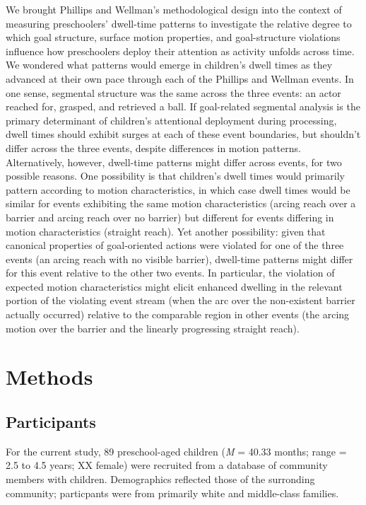 \documentclass[
  english,
  man,floatsintext]{apa6}
\begin{document}
We brought Phillips and Wellman's methodological design into the context of measuring preschoolers' dwell-time patterns to investigate the relative degree to which goal structure, surface motion properties, and goal-structure violations influence how preschoolers deploy their attention as activity unfolds across time. We wondered what patterns would emerge in children's dwell times as they advanced at their own pace through each of the Phillips and Wellman events. In one sense, segmental structure was the same across the three events: an actor reached for, grasped, and retrieved a ball. If goal-related segmental analysis is the primary determinant of children's attentional deployment during processing, dwell times should exhibit surges at each of these event boundaries, but shouldn't differ across the three events, despite differences in motion patterns. Alternatively, however, dwell-time patterns might differ across events, for two possible reasons. One possibility is that children's dwell times would primarily pattern according to motion characteristics, in which case dwell times would be similar for events exhibiting the same motion characteristics (arcing reach over a barrier and arcing reach over no barrier) but different for events differing in motion characteristics (straight reach). Yet another possibility: given that canonical properties of goal-oriented actions were violated for one of the three events (an arcing reach with no visible barrier), dwell-time patterns might differ for this event relative to the other two events. In particular, the violation of expected motion characteristics might elicit enhanced dwelling in the relevant portion of the violating event stream (when the arc over the non-existent barrier actually occurred) relative to the comparable region in other events (the arcing motion over the barrier and the linearly progressing straight reach).

\hypertarget{methods}{%
\section{Methods}\label{methods}}

\hypertarget{participants}{%
\subsection{Participants}\label{participants}}

For the current study, 89 preschool-aged children (\emph{M} = 40.33 months; range = 2.5 to 4.5 years; XX female) were recruited from a database of community members with children. Demographics reflected those of the surronding community; particpants were from primarily white and middle-class families.
\end{document}
